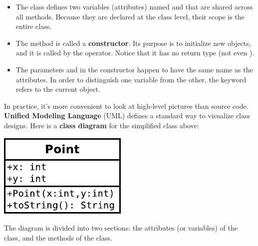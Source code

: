\begin{itemize}

\item The class defines two variables (attributes) named  and  that are shared across all methods.
Because they are declared at the class level, their scope is the entire class.

\item The method  is called a {\bf constructor}.
Its purpose is to initialize new objects, and it is called by the  operator.
Notice that it has no return type (not even ).

\item The parameters  and  in the constructor happen to have the same name as the attributes.
In order to distinguish one variable from the other, the keyword  refers to the current object.


\end{itemize}

In practice, it's more convenient to look at high-level pictures than source code.
{\bf Unified Modeling Language} (UML) defines a standard way to visualize class designs.
Here is a {\bf class diagram} for the simplified  class above:

\begin{center}
\vspace{1ex}
\includegraphics{figs/point.pdf}
\vspace{1ex}
\end{center}

The diagram is divided into two sections: the attributes (or variables) of the class, and the methods of the class.



